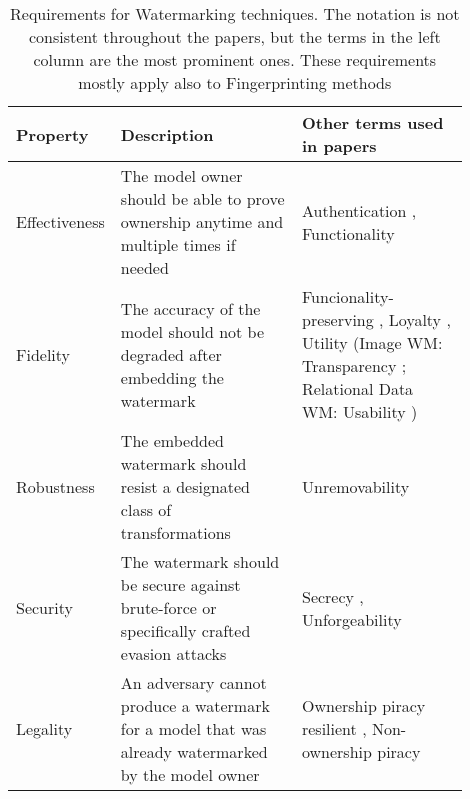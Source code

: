\begin{table}
\small
\centering
\caption{Requirements for Watermarking techniques. The notation is not consistent throughout the papers, but the terms in the left column are the most prominent ones. These requirements mostly apply also to Fingerprinting methods}


\begin{tabular}{|p{0.13 \linewidth}|p{0.40 \linewidth}|p{0.37 \linewidth}|}
\hline
\textbf{Property}               & \textbf{Description}                                                                                              & \textbf{Other terms used in papers}                        \\ \hline
%
Effectiveness                   & The model owner should be able to prove ownership anytime and multiple times if needed                            & Authentication \cite{li_piracy_2020}, Functionality \cite{li_how_2019}                              \\ \hline
%
Fidelity                        & The accuracy of the model should not be degraded after embedding the watermark                                    & Funcionality-preserving \cite{li_piracy_2020, wang_robust_2020, adi_turning_2018}, Loyalty \cite{merrer_adversarial_2019}, Utility \cite{szyller_dawn_2020}
\scriptsize{(Image WM: Transparency \cite{potdar_survey_2005}; Relational Data WM: Usability \cite{kamran_comprehensive_2018})}                \\ \hline
%
Robustness                      & The embedded watermark should resist a designated class of transformations                                        & Unremovability \cite{adi_turning_2018, szyller_dawn_2020}                                            \\ \hline
%
Security                        & The watermark should be secure against brute-force or specifically crafted evasion attacks                        & Secrecy \cite{skripniuk_black-box_2020}, Unforgeability \cite{adi_turning_2018, wang_robust_2020}                                    \\ \hline
%
Legality                        & An adversary cannot produce a watermark for a model that was already watermarked by the model owner               & Ownership piracy resilient \cite{adi_turning_2018, wang_robust_2020}, Non-ownership piracy \cite{szyller_dawn_2020}           \\ \hline

\end{tabular}
\end{table}
